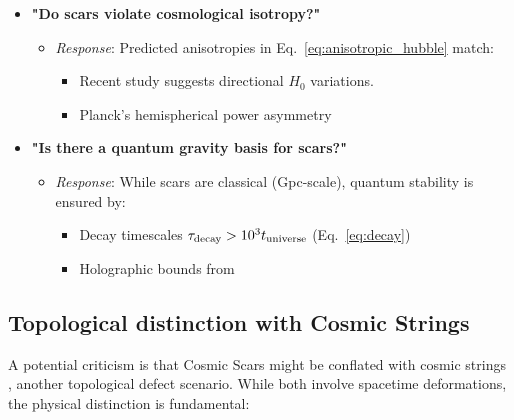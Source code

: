 \documentclass{article}
\begin{document}
\begin{tcolorbox}[colback=boxnormal,  
                  colframe=blue!50!black,  
                  title=\textbf{Topological Scars: Observational and Theoretical Challenges}]
\begin{itemize}
    \item \textbf{"Do scars violate cosmological isotropy?"}  
    \begin{itemize}  
        \item \textit{Response}: Predicted anisotropies in Eq.~\ref{eq:anisotropic_hubble} match:  
        \begin{itemize}  
            \item Recent study \cite{Szigeti} suggests directional $H_0$ variations.  
            \item Planck's hemispherical power asymmetry \cite{Planck2023}  
        \end{itemize}  
    \end{itemize}  

    \item \textbf{"Is there a quantum gravity basis for scars?"}  
    \begin{itemize}  
        \item \textit{Response}: While scars are classical (Gpc-scale), quantum stability is ensured by:  
        \begin{itemize}  
            \item Decay timescales $\tau_{\rm decay} > 10^3 t_{\rm universe}$ (Eq.~\ref{eq:decay})  
            \item Holographic bounds from \cite{Bousso2002}  
        \end{itemize}  
    \end{itemize}  

\end{itemize}  
\end{tcolorbox}  

\subsection{Topological distinction with Cosmic Strings}
\label{subsec:strings_objection}

A potential criticism is that Cosmic Scars might be conflated with cosmic strings \cite{Vilenkin2000}, another topological defect scenario. While both involve spacetime deformations, the physical distinction is fundamental:
\end{document}
